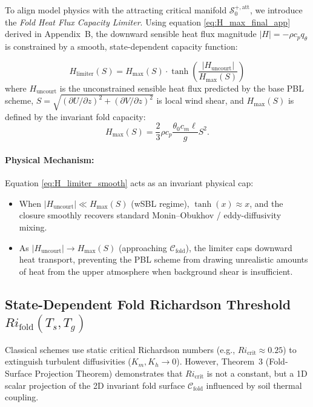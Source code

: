 To align model physics with the attracting critical manifold $\mathcal{S}_0^{+,\mathrm{att}}$, we introduce the \emph{Fold Heat Flux Capacity Limiter}. Using equation \eqref{eq:H_max_final_app} derived in Appendix~B, the downward sensible heat flux magnitude $|H| = -\rho c_p q_\theta$ is constrained by a smooth, state-dependent capacity function:

\begin{equation}
\boxed{
H_{\mathrm{limiter}}(S) = H_{\max}(S) \cdot \tanh\left( \frac{|H_{\mathrm{uncourt}}|}{H_{\max}(S)} \right)
}
\label{eq:H_limiter_smooth}
\end{equation}
where $H_{\mathrm{uncourt}}$ is the unconstrained sensible heat flux predicted by the base PBL scheme, $S = \sqrt{(\partial U/\partial z)^2 + (\partial V/\partial z)^2}$ is local wind shear, and $H_{\max}(S)$ is defined by the invariant fold capacity:
\begin{equation}
H_{\max}(S) = \frac{2}{3} \rho c_p \frac{\theta_0 c_m \ell}{g} S^2.
\label{eq:H_max_closure}
\end{equation}

\paragraph{Physical Mechanism:}
Equation \eqref{eq:H_limiter_smooth} acts as an invariant physical cap:
\begin{itemize}
    \item When $|H_{\mathrm{uncourt}}| \ll H_{\max}(S)$ (wSBL regime), $\tanh(x) \approx x$, and the closure smoothly recovers standard Monin--Obukhov / eddy-diffusivity mixing.
    \item As $|H_{\mathrm{uncourt}}| \to H_{\max}(S)$ (approaching $\mathcal{C}_{\mathrm{fold}}$), the limiter caps downward heat transport, preventing the PBL scheme from drawing unrealistic amounts of heat from the upper atmosphere when background shear is insufficient.
\end{itemize}

\subsection{State-Dependent Fold Richardson Threshold $Ri_{\mathrm{fold}}(T_s, T_g)$}

Classical schemes use static critical Richardson numbers (e.g., $Ri_{\mathrm{crit}} \approx 0.25$) to extinguish turbulent diffusivities ($K_m, K_h \to 0$). However, Theorem~3 (Fold-Surface Projection Theorem) demonstrates that $Ri_{\mathrm{crit}}$ is not a constant, but a 1D scalar projection of the 2D invariant fold surface $\mathcal{C}_{\mathrm{fold}}$ influenced by soil thermal coupling.


